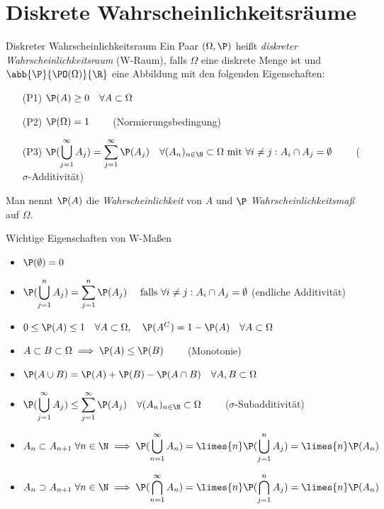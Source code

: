 \section*{Diskrete Wahrscheinlichkeitsräume}

\begin{karte}{Diskreter Wahrscheinlichkeitsraum}
	Ein Paar $(\Omega, \P)$ heißt \textit{diskreter Wahrscheinlichkeitsraum} (W-Raum), falls $\Omega$ eine diskrete Menge ist und $\abb{\P}{\PO(\Omega)}{\R}$ eine Abbildung mit den folgenden Eigenschaften:
	\begin{itemize}
		\item[(P1)] $\P(A) \geq 0 \quad \forall A \subset \Omega$
		\item[(P2)] $\P(\Omega) = 1 \qquad$ (Normierungsbedingung)
		\item[(P3)] $\displaystyle \P(\bigcup_{j=1}^{\infty} A_j) = \sum_{j=1}^{\infty} \P(A_j) \quad \forall (A_n)_{n \in \N} \subset \Omega \text{ mit } \forall i\neq j: A_i \cap A_j = \emptyset \qquad$ ($\sigma$-Additivität)
	\end{itemize}
	Man nennt $\P(A)$ die \textit{Wahrscheinlichkeit} von $A$ und $\P$ \textit{Wahrscheinlichkeitsmaß} auf $\Omega$.
\end{karte}

\begin{karte}{Wichtige Eigenschaften von W-Maßen}
	\begin{itemize}
		\item $\P(\emptyset)=0$
		\item $\displaystyle \P(\bigcup_{j=1}^{n} A_j) = \sum_{j=1}^{n} \P(A_j) \quad \text{ falls } \forall i\neq j: A_i \cap A_j = \emptyset$ (endliche Additivität)
		\item $0 \leq \P(A) \leq 1 \quad \forall A \subset \Omega, \quad \P(A^C) = 1-\P(A) \quad \forall A \subset \Omega$
		\item $A \subset B \subset \Omega \implies \P(A) \leq \P(B) \qquad$ (Monotonie)
		\item $\P(A \cup B) = \P(A)+\P(B)-\P(A \cap B) \quad \forall A,B \subset \Omega$
		\item $\displaystyle \P(\bigcup_{j=1}^{\infty} A_j) \leq \sum_{j=1}^{\infty} \P(A_j) \quad \forall (A_n)_{n \in \N} \subset \Omega \qquad$ ($\sigma$-Subadditivität)
		\item $\displaystyle A_n \subset A_{n+1} \; \forall n \in \N \implies \P(\bigcup_{n=1}^{\infty} A_n) = \limes{n} \P(\bigcup_{j=1}^{n} A_j) = \limes{n} \P(A_n)$
		\item $\displaystyle A_n \supset A_{n+1} \; \forall n \in \N \implies \P(\bigcap_{n=1}^{\infty} A_n) = \limes{n} \P(\bigcap_{j=1}^{n} A_j) = \limes{n} \P(A_n)$
	\end{itemize}
\end{karte}

